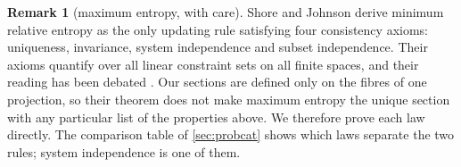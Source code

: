 \documentclass[11pt]{article}
\theoremstyle{definition}\newtheorem{definition}[theorem]{Definition}\newtheorem{remark}[theorem]{Remark}\newtheorem{example}[theorem]{Example}\newtheorem{problem}[theorem]{Open problem}\crefname{problem}{Problem}{Problems}
\begin{document}
\begin{remark}[maximum entropy, with care]\label{rem:shorejohnson}
Shore and Johnson \cite{ShoreJohnson1980} derive minimum relative entropy as the only updating rule satisfying four consistency axioms: uniqueness, invariance, system independence and subset independence. Their axioms quantify over all linear constraint sets on all finite spaces, and their reading has been debated \cite{Uffink1995}. Our sections are defined only on the fibres of one projection, so their theorem does not make maximum entropy the unique section with any particular list of the properties above. We therefore prove each law directly. The comparison table of \cref{sec:probcat} shows which laws separate the two rules; system independence is one of them.
\end{remark}
\end{document}
